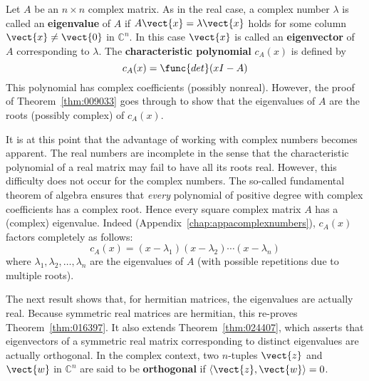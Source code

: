 Let $A$ be an $n \times n$ complex matrix. As in the real case, a complex number $\lambda$ is called an \textbf{eigenvalue} of $A$ if $A\vect{x} = \lambda \vect{x}$ holds for some column $\vect{x} \neq \vect{0}$ in $\mathbb{C}^n$. In this case $\vect{x}$ is called an \textbf{eigenvector} of $A$ corresponding to $\lambda$. The \textbf{characteristic polynomial} $c_{A}(x)$ is defined by
\begin{equation*}
c_{A}(x) = \func{det}(xI - A)
\end{equation*}
This polynomial has complex coefficients (possibly nonreal). However, the proof of Theorem~\ref{thm:009033} goes through to show that the eigenvalues of $A$ are the roots (possibly complex) of $c_{A}(x)$.

It is at this point that the advantage 
of working with complex numbers becomes apparent. The real numbers are 
incomplete in the sense that the characteristic polynomial of a real 
matrix may fail to have all its roots real. However, this difficulty 
does not occur for the complex numbers. The so-called fundamental 
theorem of algebra ensures that \textit{every} polynomial of positive degree with complex coefficients has a complex root. Hence every square complex matrix $A$ has a (complex) eigenvalue. Indeed (Appendix~\ref{chap:appacomplexnumbers}), $c_{A}(x)$ factors completely as follows:
\begin{equation*}
c_{A}(x) = (x -\lambda_{1})(x -\lambda_{2}) \cdots (x -\lambda_{n})
\end{equation*}
where $\lambda_{1}, \lambda_{2}, \dots, \lambda_{n}$ are the eigenvalues of $A$ (with possible repetitions due to multiple roots).


The next result shows that, for 
hermitian matrices, the eigenvalues are actually real. Because symmetric
 real matrices are hermitian, this re-proves Theorem~\ref{thm:016397}. It also extends Theorem~\ref{thm:024407},
 which asserts that eigenvectors of a symmetric real matrix 
corresponding to distinct eigenvalues are actually orthogonal. In the 
complex context, two $n$-tuples $\vect{z}$ and $\vect{w}$ in $\mathbb{C}^n$ are said to be \textbf{orthogonal} if $\langle \vect{z}, \vect{w} \rangle = 0$.



